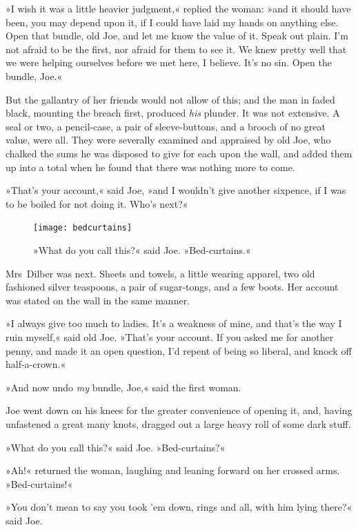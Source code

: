 »I wish it was a little heavier judgment,« replied the woman: »and it should have been, you may depend upon it, if I could have laid my hands on anything else. Open that bundle, old Joe, and let me know the value of it. Speak out plain. I'm not afraid to be the first, nor afraid for them to see it. We knew pretty well that we were helping ourselves before we met here, I believe. It's no sin. Open the bundle, Joe.«

But the gallantry of her friends would not allow of this; and the man in faded black, mounting the breach first, produced \textit{his} plunder. It was not extensive. A seal or two, a pencil-case, a pair of sleeve-buttons, and a brooch of no great value, were all. They were severally examined and appraised by old Joe, who chalked the sums he was disposed to give for each upon the wall, and added them up into a total when he found that there was nothing more to come.

»That's your account,« said Joe, »and I wouldn't give another sixpence, if I was to be boiled for not doing it. Who's next?«

\begin{figure}[p]
\centering
\texttt{[image: bedcurtains]}
\caption[\textbf{»Bed-curtains.«}]{»What do you call this?« said Joe. »Bed-curtains.«}
\end{figure}

Mrs~Dilber was next. Sheets and towels, a little wearing apparel, two old fashioned silver teaspoons, a pair of sugar-tongs, and a few boots. Her account was stated on the wall in the same manner.

»I always give too much to ladies. It's a weakness of mine, and that's the way I ruin myself,« said old Joe. »That's your account. If you asked me for another penny, and made it an open question, I'd repent of being so liberal, and knock off half-a-crown.«

»And now undo \textit{my} bundle, Joe,« said the first woman.

Joe went down on his knees for the greater convenience of opening it, and, having unfastened a great many knots, dragged out a large heavy roll of some dark stuff.

»What do you call this?« said Joe. »Bed-curtains?«

»Ah!« returned the woman, laughing and leaning forward on her crossed arms. »Bed-curtains!«

»You don't mean to say you took 'em down, rings and all, with him lying there?« said Joe.

